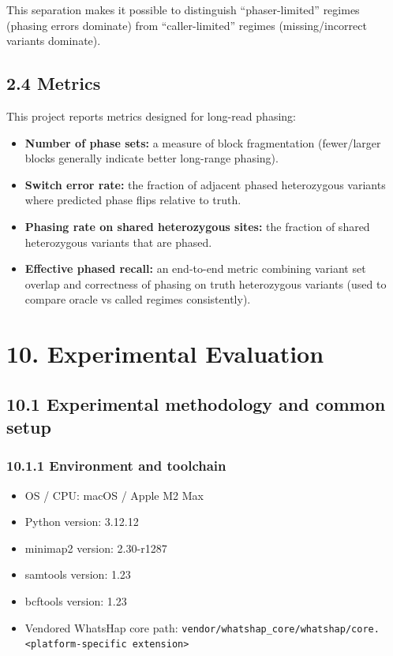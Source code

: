 \documentclass[
]{article}
\providecommand{\tightlist}{%
  \setlength{\itemsep}{0pt}\setlength{\parskip}{0pt}}
\begin{document}
This separation makes it possible to distinguish ``phaser-limited''
regimes (phasing errors dominate) from ``caller-limited'' regimes
(missing/incorrect variants dominate).

\subsection{2.4 Metrics}\label{metrics}

This project reports metrics designed for long-read phasing:

\begin{itemize}
\tightlist
\item
  \textbf{Number of phase sets:} a measure of block fragmentation
  (fewer/larger blocks generally indicate better long-range phasing).
\item
  \textbf{Switch error rate:} the fraction of adjacent phased
  heterozygous variants where predicted phase flips relative to truth.
\item
  \textbf{Phasing rate on shared heterozygous sites:} the fraction of
  shared heterozygous variants that are phased.
\item
  \textbf{Effective phased recall:} an end-to-end metric combining
  variant set overlap and correctness of phasing on truth heterozygous
  variants (used to compare oracle vs called regimes consistently).
\end{itemize}

\section{10. Experimental Evaluation}\label{experimental-evaluation}

\subsection{10.1 Experimental methodology and common
setup}\label{experimental-methodology-and-common-setup}

\subsubsection{10.1.1 Environment and
toolchain}\label{environment-and-toolchain}

\begin{itemize}
\tightlist
\item
  OS / CPU: macOS / Apple M2 Max
\item
  Python version: 3.12.12
\item
  minimap2 version: 2.30-r1287
\item
  samtools version: 1.23
\item
  bcftools version: 1.23
\item
  Vendored WhatsHap core path:
  \texttt{vendor/whatshap\_core/whatshap/core.\textless{}platform-specific\ extension\textgreater{}}
\end{itemize}
\end{document}

